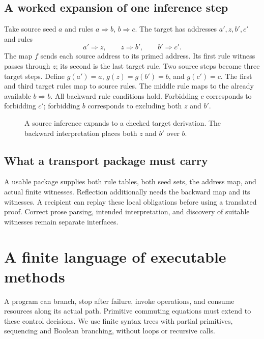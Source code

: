 \section{A worked expansion of one inference step}
Take source seed $a$ and rules $a\Rightarrow b$, $b\Rightarrow c$. The target has addresses $a',z,b',c'$ and rules
\[
a'\Rightarrow z,\qquad z\Rightarrow b',\qquad b'\Rightarrow c'.
\]
The map $f$ sends each source address to its primed address. Its first rule witness passes through $z$; its second is the last target rule. Two source steps become three target steps. Define $g(a')=a$, $g(z)=g(b')=b$, and $g(c')=c$. The first and third target rules map to source rules. The middle rule maps to the already available $b\Rightarrow b$. All backward rule conditions hold. Forbidding $c$ corresponds to forbidding $c'$; forbidding $b$ corresponds to excluding both $z$ and $b'$.
\begin{figure}[htbp]\centering
{}
\caption{A source inference expands to a checked target derivation. The backward interpretation places both $z$ and $b'$ over $b$.}
\end{figure}

\section{What a transport package must carry}
A usable package supplies both rule tables, both seed sets, the address map, and actual finite witnesses. Reflection additionally needs the backward map and its witnesses. A recipient can replay these local obligations before using a translated proof. Correct prose parsing, intended interpretation, and discovery of suitable witnesses remain separate interfaces.

\chapter{A finite language of executable methods}\label{Core:book:chapter-16}
\setcounter{section}{0}
A program can branch, stop after failure, invoke operations, and consume resources along its actual path. Primitive commuting equations must extend to these control decisions. We use finite syntax trees with partial primitives, sequencing and Boolean branching, without loops or recursive calls.

